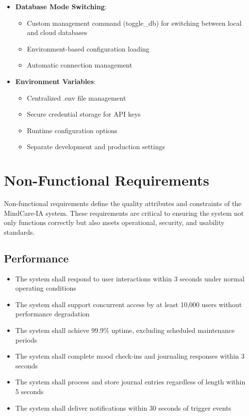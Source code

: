 \begin{itemize}
  \item \textbf{Database Mode Switching}:
    \begin{itemize}
      \item Custom management command (toggle\_db) for switching between local and cloud databases
      \item Environment-based configuration loading
      \item Automatic connection management
    \end{itemize}
    
  \item \textbf{Environment Variables}:
    \begin{itemize}
      \item Centralized .env file management
      \item Secure credential storage for API keys
      \item Runtime configuration options
      \item Separate development and production settings
    \end{itemize}
\end{itemize}

\section{Non-Functional Requirements}
Non-functional requirements define the quality attributes and constraints of the MindCare-IA system. These requirements are critical to ensuring the system not only functions correctly but also meets operational, security, and usability standards.

\subsection{Performance}
\begin{itemize}
    \item The system shall respond to user interactions within 3 seconds under normal operating conditions
    \item The system shall support concurrent access by at least 10,000 users without performance degradation
    \item The system shall achieve 99.9\% uptime, excluding scheduled maintenance periods
    \item The system shall complete mood check-ins and journaling responses within 3 seconds
    \item The system shall process and store journal entries regardless of length within 5 seconds
    \item The system shall deliver notifications within 30 seconds of trigger events
\end{itemize}


